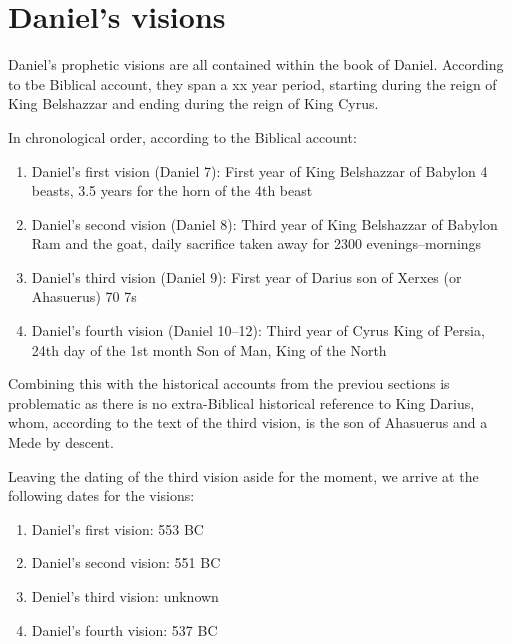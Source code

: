 \chapter{Daniel's visions}
Daniel's prophetic visions are all contained within the book of Daniel.  According to tbe Biblical account, they span a xx year period, starting during the reign of King Belshazzar
and ending during the reign of King Cyrus.

In chronological order, according to the Biblical account:
\begin{enumerate}
    \item Daniel's first vision (Daniel 7): First year of King Belshazzar of Babylon  4 beasts, 3.5 years for the horn of the 4th beast
    \item Daniel's second vision (Daniel 8): Third year of King Belshazzar of Babylon Ram and the goat, daily sacrifice taken away for 2300 evenings--mornings
    \item Daniel's third vision (Daniel 9): First year of Darius son of Xerxes (or Ahasuerus)  70 7s
    \item Daniel's fourth vision (Daniel 10--12): Third year of Cyrus King of Persia, 24th day of the 1st month  Son of Man, King of the North
\end{enumerate}

Combining this with the historical accounts from the previou sections is problematic as there is no extra-Biblical historical reference to King Darius, whom,
according to the text of the third vision, is the son of Ahasuerus and a Mede by descent.

Leaving the dating of the third vision aside for the moment, we arrive at the following dates for the visions:
\begin{enumerate}
    \item Daniel's first vision: 553 BC
    \item Daniel's second vision: 551 BC
    \item Deniel's third vision: unknown
    \item Daniel's fourth vision: 537 BC
\end{enumerate}
